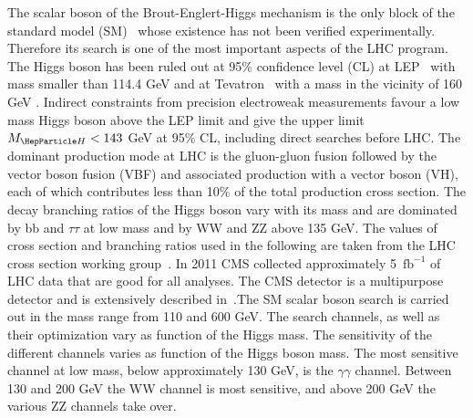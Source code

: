 \documentclass{cimento}
\newcommand{\mH}{\ensuremath{m_{\mathrm{H}}}\xspace}
\newcommand{\MH}{\ensuremath{M_{\PH}}}
\newcommand{\fbinv} {\mbox{\ensuremath{\,\text{fb}^\text{$-$1}}}\xspace}
\begin{document}
The scalar boson of the Brout-Englert-Higgs mechanism is the only
block of the standard model (SM)~\cite{SM1,SM2,Higgs1,Higgs2} whose
existence has not been verified experimentally. Therefore its search
is one of the most important aspects of the LHC program.
The Higgs boson has been ruled out at 95\% confidence level (CL) at
LEP~\cite{leplimits} with mass smaller than 114.4 GeV and at
Tevatron~\cite{tevatronlimits} with a mass in
the vicinity of 160 GeV .  Indirect constraints from precision
electroweak measurements favour a low mass Higgs
boson above the LEP limit and give the upper limit
$\MH<143$ GeV at 95\% CL, including direct searches before LHC.
The dominant production mode at LHC is the gluon-gluon fusion followed
by the vector boson fusion (VBF) and associated production with a
vector boson (VH), each of which contributes less than 10\% of the
total production cross section. The decay branching ratios of the
Higgs boson vary with its mass and are dominated by bb and $\tau\tau$
at low mass and by WW and ZZ above 135 GeV.  The values of cross
section and branching ratios used in the following are taken from the
LHC cross section working
group~\cite{Dittmaier:2012vm}.
In 2011 CMS collected approximately 5 \fbinv of LHC data that are good
for all analyses.  The CMS detector is a multipurpose detector and is
extensively described in~\cite{CMSdetector}.The SM scalar boson search
is carried out in the mass range from 110 and 600 GeV.  The search
channels, as well as their optimization vary as function of the Higgs
mass.  The sensitivity of the different channels varies as function of
the Higgs boson mass.  The most sensitive channel at low mass, below
approximately 130 GeV, is the $\gamma\gamma$ channel. Between 130 and
200 GeV the WW channel is most sensitive, and above 200 GeV the
various ZZ channels take over.
\end{document}
